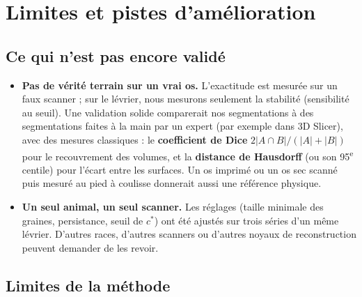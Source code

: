 \documentclass[11pt,a4paper]{article}
\begin{document}
\section{Limites et pistes d'amélioration}
\label{sec-limites}

\subsection{Ce qui n'est pas encore validé}

\begin{itemize}
  \item \textbf{Pas de vérité terrain sur un vrai os.} L'exactitude est mesurée sur un faux scanner ; sur le
  lévrier, nous mesurons seulement la stabilité (sensibilité au seuil). Une validation solide comparerait nos
  segmentations à des segmentations faites à la main par un expert (par exemple dans 3D Slicer), avec des mesures
  classiques : le \textbf{coefficient de Dice} $2|A \cap B| / (|A| + |B|)$ pour le recouvrement des volumes, et la
  \textbf{distance de Hausdorff} (ou son 95\textsuperscript{e} centile) pour l'écart entre les surfaces. Un os imprimé ou
  un os sec scanné puis mesuré au pied à coulisse donnerait aussi une référence physique.
  \item \textbf{Un seul animal, un seul scanner.} Les réglages (taille minimale des graines, persistance, seuil de
  $c^*$) ont été ajustés sur trois séries d'un même lévrier. D'autres races, d'autres scanners ou d'autres noyaux de
  reconstruction peuvent demander de les revoir.
\end{itemize}

\subsection{Limites de la méthode}
\end{document}
